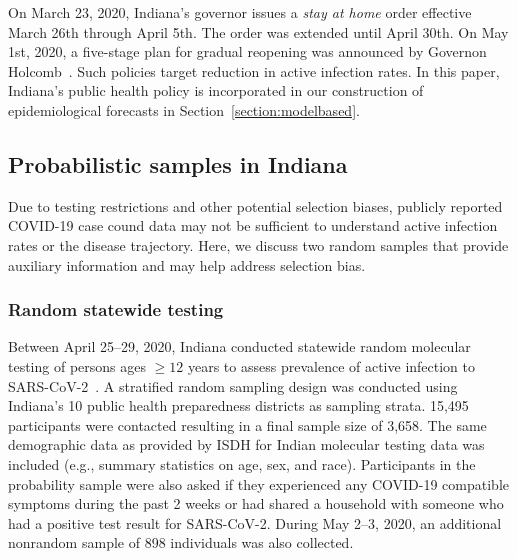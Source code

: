 \documentclass[11pt]{amsart}
\numberwithin{equation}{section}
\theoremstyle{plain}
\begin{document}
On March 23, 2020, Indiana's governor issues a \emph{stay at home} order effective March 26th through April 5th.  The order was extended until April 30th. On May 1st, 2020, a five-stage plan for gradual reopening was announced by Governon Holcomb~\citep{fivestageplan}.  Such policies target reduction in active infection rates. In this paper, Indiana's public health policy is incorporated in our construction of epidemiological forecasts in Section~\ref{section:modelbased}.


\subsection{Probabilistic samples in Indiana}

Due to testing restrictions and other potential selection biases, publicly reported COVID-19 case cound data may not be sufficient to understand active infection rates or the disease trajectory.  Here, we discuss two random samples that provide auxiliary information and may help address selection bias.

\subsubsection{Random statewide testing}

Between April 25--29, 2020, Indiana conducted statewide random molecular testing of persons ages $\geq 12$ years to assess prevalence of active infection to SARS-CoV-2~\citep{Yiannoutsos2021}. A stratified random sampling design was conducted using Indiana’s 10 public health preparedness districts as sampling strata. 15,495 participants were contacted resulting in a final sample size of 3,658. The same demographic data as provided by ISDH for Indian molecular testing data was included (e.g., summary statistics on age, sex, and race). Participants in the probability sample were also asked if they experienced any COVID-19 compatible symptoms during the past 2 weeks or had shared a household with someone who had a positive test result for SARS-CoV-2. During May 2--3, 2020, an additional nonrandom sample of 898 individuals was also collected.
\end{document}
